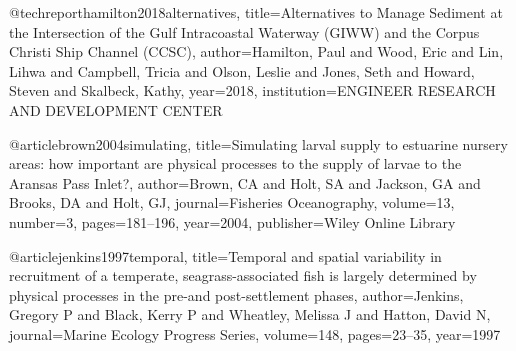 @techreport{hamilton2018alternatives,
  title={Alternatives to Manage Sediment at the Intersection of the Gulf Intracoastal Waterway (GIWW) and the Corpus Christi Ship Channel (CCSC)},
  author={Hamilton, Paul and Wood, Eric and Lin, Lihwa and Campbell, Tricia and Olson, Leslie and Jones, Seth and Howard, Steven and Skalbeck, Kathy},
  year={2018},
  institution={ENGINEER RESEARCH AND DEVELOPMENT CENTER}
}

@article{brown2004simulating,
  title={Simulating larval supply to estuarine nursery areas: how important are physical processes to the supply of larvae to the Aransas Pass Inlet?},
  author={Brown, CA and Holt, SA and Jackson, GA and Brooks, DA and Holt, GJ},
  journal={Fisheries Oceanography},
  volume={13},
  number={3},
  pages={181--196},
  year={2004},
  publisher={Wiley Online Library}
}

@article{jenkins1997temporal,
  title={Temporal and spatial variability in recruitment of a temperate, seagrass-associated fish is largely determined by physical processes in the pre-and post-settlement phases},
  author={Jenkins, Gregory P and Black, Kerry P and Wheatley, Melissa J and Hatton, David N},
  journal={Marine Ecology Progress Series},
  volume={148},
  pages={23--35},
  year={1997}
}

